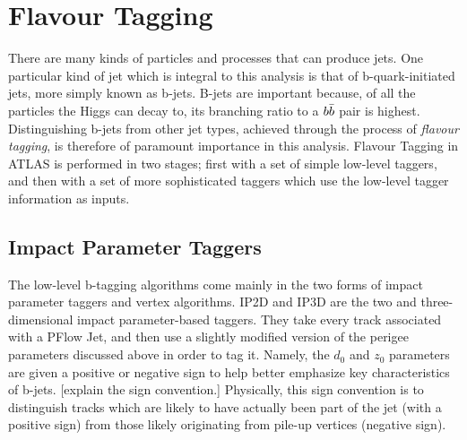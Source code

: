 
    \section{Flavour Tagging}
        
        There are many kinds of particles and processes that can produce jets.
        One particular kind of jet which is integral to this analysis is that of b-quark-initiated jets,
            more simply known as b-jets.
        B-jets are important because, of all the particles the Higgs can decay to,
            its branching ratio to a $b \bar{b}$ pair is highest.
        Distinguishing b-jets from other jet types,
            achieved through the process of \textit{flavour tagging},
            is therefore of paramount importance in this analysis.
        Flavour Tagging in ATLAS is performed in two stages;
            first with a set of simple low-level taggers,
            and then with a set of more sophisticated taggers which use the low-level tagger information as inputs.

        \subsection{Impact Parameter Taggers}

            The low-level b-tagging algorithms come mainly in the two forms of impact parameter taggers and vertex algorithms.
            IP2D and IP3D are the two and three-dimensional impact parameter-based taggers.
            They take every track associated with a PFlow Jet,
                and then use a slightly modified version of the perigee parameters discussed above in order to tag it.
            Namely, the $d_0$ and $z_0$ parameters are given a positive or negative sign to help better emphasize key characteristics of b-jets.
            [explain the sign convention.]
            Physically, this sign convention is to distinguish tracks which are likely to have actually been part of the jet (with a positive sign)
                from those likely originating from pile-up vertices (negative sign).

